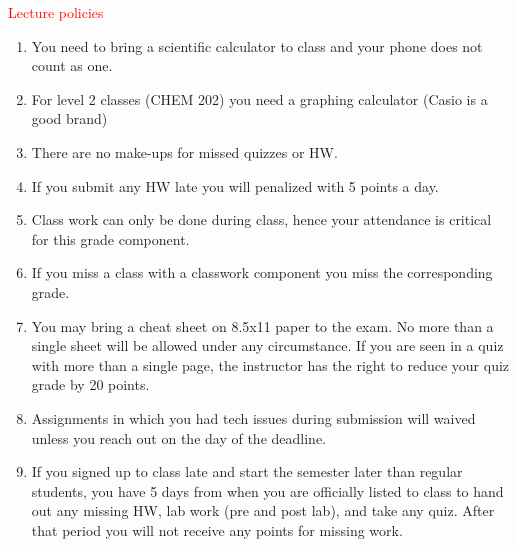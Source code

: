 \documentclass[cover.tex]{subfiles}
\begin{document}
 


\begin{mdframed}[style=MyFrame]
\begin{center}{\textcolor{red}{\Large Lecture policies}}\end{center}
\begin{enumerate}
\item You need to bring a scientific calculator to class and your phone does not count as one.
\item For level 2 classes (CHEM 202) you need a graphing calculator (Casio is a good brand)
\item There are no make-ups for missed quizzes or HW.
\item If you submit any HW late you will penalized with 5 points a day.
\item Class work can only be done during class, hence your attendance is critical for this grade component.
\item If you miss a class with a classwork component you miss the corresponding grade.
\item You may bring a cheat sheet on 8.5x11 paper to the exam. No more than a single sheet will be allowed under any circumstance. If you are seen in a quiz with more than a single page, the instructor has the right to reduce your quiz grade by 20 points.
\item Assignments in which you had tech issues during submission will waived unless you reach out on the day of the deadline.
\item If you signed up to class late and start the semester later than regular students, you have 5 days from when you are officially listed to class to hand out any missing HW, lab work (pre and post lab), and take any quiz. After that period you will not receive any points for missing work.
\end{enumerate}
 
    \par\noindent\makebox[1.5in]{\hrulefill}   \hfill\makebox[2.0in]{\hrulefill}    \hfill\makebox[2.0in]{\hrulefill}  \par\noindent{}    \hfill{}   \hfill{} 
 

\end{mdframed}
\end{document}
